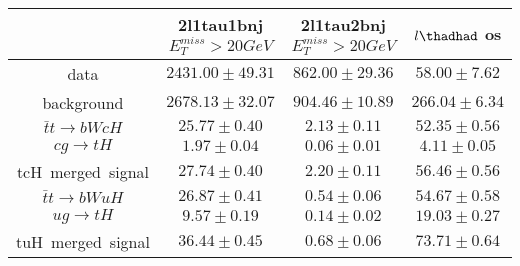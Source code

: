 \begin{tabular}{|c|c|c|c|} \hline
 & 2l1tau1bnj  $E_T^{miss}>20GeV$ & 2l1tau2bnj  $E_T^{miss}>20GeV$ & $l\thadhad$ os\\\hline
data & $2431.00\pm49.31$ & $862.00\pm29.36$ & $58.00\pm7.62$\\\hline
background & $2678.13\pm32.07$ & $904.46\pm10.89$ & $266.04\pm6.34$\\\hline
$\bar{t}t\to bWcH$ & $25.77\pm0.40$ & $2.13\pm0.11$ & $52.35\pm0.56$\\\hline
$cg\to tH$ & $1.97\pm0.04$ & $0.06\pm0.01$ & $4.11\pm0.05$\\\hline
tcH~merged~signal & $27.74\pm0.40$ & $2.20\pm0.11$ & $56.46\pm0.56$\\\hline
$\bar{t}t\to bWuH$ & $26.87\pm0.41$ & $0.54\pm0.06$ & $54.67\pm0.58$\\\hline
$ug\to tH$ & $9.57\pm0.19$ & $0.14\pm0.02$ & $19.03\pm0.27$\\\hline
tuH~merged~signal & $36.44\pm0.45$ & $0.68\pm0.06$ & $73.71\pm0.64$\\\hline
\end{tabular}
